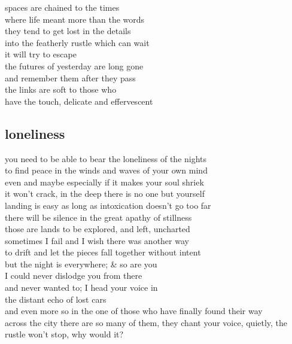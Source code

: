 \documentclass{article}
\begin{document}
spaces are chained to the times\\
where life meant more than the words\\
they tend to get lost in the details\\
into the featherly rustle which can wait\\
it will try to escape\\

the futures of yesterday are long gone\\
and remember them after they pass\\
the links are soft to those who\\
have the touch, delicate and effervescent\\
\clearpage

\subsection{loneliness}

you need to be able to bear the loneliness of the nights\\
to find peace in the winds and waves of your own mind\\
even and maybe especially if it makes your soul shriek\\
it won't crack, in the deep there is no one but yourself\\

landing is easy as long as intoxication doesn't go too far\\
there will be silence in the great apathy of stillness\\
those are lands to be explored, and left, uncharted\\
sometimes I fail and I wish there was another way\\
to drift and let the pieces fall together without intent\\

but the night is everywhere; \& so are you\\
I could never dislodge you from there\\
and never wanted to; I head your voice in\\
the distant echo of lost cars\\
and even more so in the one of those who have finally found their way\\
across the city there are so many of them, they chant your voice,
quietly, the rustle won't stop, why would it?

\clearpage
\end{document}
